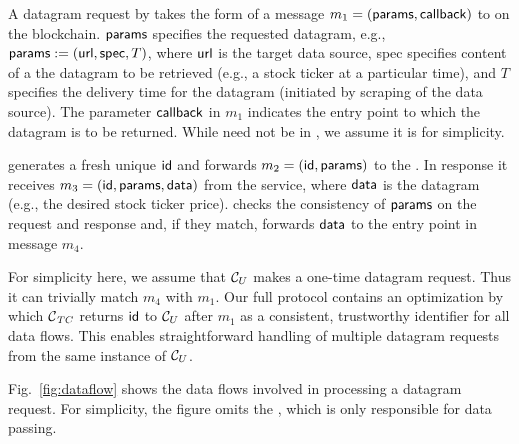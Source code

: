 A datagram request by \reqcont takes the form of a message $m_1 = ({\sf params}, {\sf callback})$ to \tcont on the blockchain.
${\sf params}$ specifies the requested datagram, e.g., ${\sf params} := ({{\sf url}}, {\sf spec}, T)$, where ${{\sf url}}$ is the target data source, {\sf spec} specifies content of a the datagram to be retrieved (e.g., a stock ticker at a particular time), and $T$ specifies the delivery time for the datagram (initiated by scraping of the data source).
The parameter ${\sf callback}$ in $m_1$ indicates the entry point to which the datagram is to be returned.
While \dgcallback need not be in \reqcont, we assume it is for simplicity.

\tcont generates a fresh unique ${\sf id}$ and forwards $m_2 = ({\sf id}, {\sf params})$ to the \encname.
In response it receives $m_3 = ({\sf id}, {\sf params}, {\sf data})$ from the \tc service, where ${\sf data}$ is the datagram (e.g., the desired stock ticker price).
\tcont checks the consistency of ${\sf params}$ on the request and response and, if they match, forwards ${\sf data}$ to the \dgcallback entry point in message $m_4$.

For simplicity here, we assume that $\reqcont$ makes a one-time datagram request. Thus it can trivially match $m_4$ with $m_1$. Our full protocol contains an optimization by which $\tcont$ returns ${\sf id}$ to $\reqcont$ after $m_1$ as a consistent, trustworthy identifier for all data flows. This enables straightforward handling of multiple datagram requests from the same instance of $\reqcont$.

Fig.~\ref{fig:dataflow} shows the data flows involved in processing a datagram request. For simplicity, the figure omits the \medname, which is only responsible for data passing.


